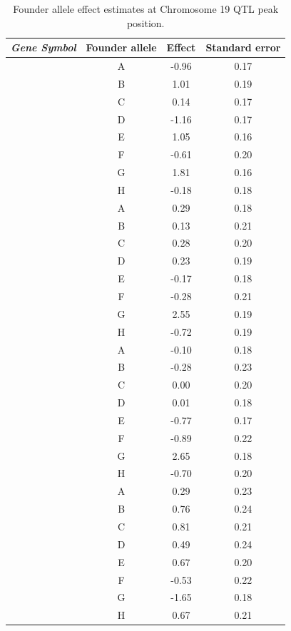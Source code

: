 \documentclass{article}
\begin{document}
\begin{table}[ht]
\caption{Founder allele effect estimates at Chromosome 19 QTL peak position.}\label{tab:effects}
\centering
\begin{tabular}{>{\em}cccc}
  \hline
 Gene Symbol & Founder allele & Effect & Standard error \\ 
  \hline
\multirow{8}{*}{Asah2} & A & -0.96 & 0.17 \\ 
  & B & 1.01 & 0.19 \\ 
  & C & 0.14 & 0.17 \\ 
  & D & -1.16 & 0.17 \\ 
  & E & 1.05 & 0.16 \\ 
  & F & -0.61 & 0.20 \\ 
  & G & 1.81 & 0.16 \\ 
  & H & -0.18 & 0.18 \\ 
  \hline
  \multirow{8}{*}{Lipo1} & A & 0.29 & 0.18 \\ 
  & B & 0.13 & 0.21 \\ 
  & C & 0.28 & 0.20 \\ 
  & D & 0.23 & 0.19 \\ 
  & E & -0.17 & 0.18 \\ 
  & F & -0.28 & 0.21 \\ 
  & G & 2.55 & 0.19 \\ 
  & H & -0.72 & 0.19 \\ 
  \hline
\multirow{8}{*}{Lipo2} & A & -0.10 & 0.18 \\ 
  & B & -0.28 & 0.23 \\ 
  & C & 0.00 & 0.20 \\ 
  & D & 0.01 & 0.18 \\ 
  & E & -0.77 & 0.17 \\ 
  & F & -0.89 & 0.22 \\ 
  & G & 2.65 & 0.18 \\ 
  & H & -0.70 & 0.20 \\ 
   \hline
\multirow{8}{*}{4933413C19Rik} & A & 0.29 & 0.23 \\ 
  & B & 0.76 & 0.24 \\ 
  & C & 0.81 & 0.21 \\ 
  & D & 0.49 & 0.24 \\ 
  & E & 0.67 & 0.20 \\ 
  & F & -0.53 & 0.22 \\ 
  & G & -1.65 & 0.18 \\ 
  & H & 0.67 & 0.21 \\ 
   \hline
\end{tabular}
\end{table}
\end{document}
